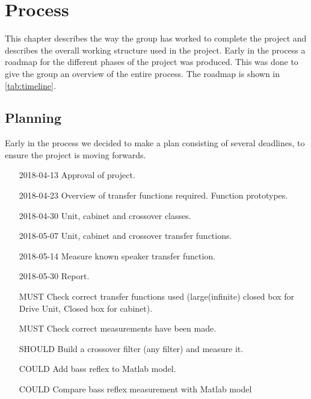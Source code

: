 
\chapter{Process}
This chapter describes the way the group has worked to complete the project and describes the overall working structure used in the project.
Early in the process a roadmap for the different phases of the project was produced. This was done to give the group an overview of the entire process. The roadmap is shown in \cref{tab:timeline}.

\section{Planning}
Early in the process we decided to make a plan consisting of several deadlines, to ensure the project is moving forwards.

\begin{itemize}
	\item[2018-04-13] Approval of project.
	\item[2018-04-23] Overview of transfer functions required. Function prototypes.
	\item[2018-04-30] Unit, cabinet and crossover classes.
	\item[2018-05-07] Unit, cabinet and crossover transfer functions. 
	\item[2018-05-14] Measure known speaker transfer function. 
	\item[2018-05-30] Report.
\end{itemize}

\begin{itemize}
	\item[MUST] Check correct transfer functions used (large(infinite) closed box for Drive Unit, Closed box for cabinet).
	\item[MUST] Check correct measurements have been made.
	\item[SHOULD] Build a crossover filter (any filter) and measure it.
	\item[COULD] Add bass reflex to Matlab model.
	\item[COULD] Compare bass reflex measurement with Matlab model
\end{itemize}